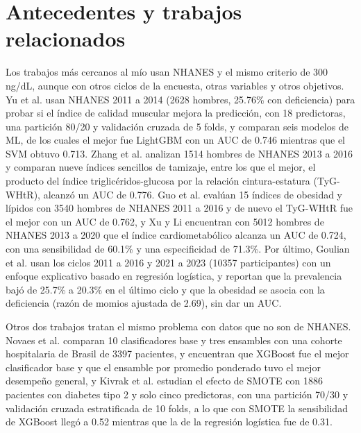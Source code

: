 \documentclass[conference]{IEEEtran}
\begin{document}
\section{Antecedentes y trabajos relacionados}
\label{sec:antecedentes}

Los trabajos más cercanos al mío usan NHANES y el mismo criterio de 300 ng/dL, aunque con otros ciclos de la encuesta, otras variables y otros objetivos. Yu et al. \cite{yu2025} usan NHANES 2011 a 2014 (2628 hombres, 25.76\% con deficiencia) para probar si el índice de calidad muscular mejora la predicción, con 18 predictoras, una partición 80/20 y validación cruzada de 5 folds, y comparan seis modelos de ML, de los cuales el mejor fue LightGBM con un AUC de 0.746 mientras que el SVM obtuvo 0.713. Zhang et al. \cite{zhang2025} analizan 1514 hombres de NHANES 2013 a 2016 y comparan nueve índices sencillos de tamizaje, entre los que el mejor, el producto del índice triglicéridos-glucosa por la relación cintura-estatura (TyG-WHtR), alcanzó un AUC de 0.776. Guo et al. \cite{guo2025} evalúan 15 índices de obesidad y lípidos con 3540 hombres de NHANES 2011 a 2016 y de nuevo el TyG-WHtR fue el mejor con un AUC de 0.762, y Xu y Li \cite{xu2024} encuentran con 5012 hombres de NHANES 2013 a 2020 que el índice cardiometabólico alcanza un AUC de 0.724, con una sensibilidad de 60.1\% y una especificidad de 71.3\%. Por último, Goulian et al. \cite{goulian2026} usan los ciclos 2011 a 2016 y 2021 a 2023 (10357 participantes) con un enfoque explicativo basado en regresión logística, y reportan que la prevalencia bajó de 25.7\% a 20.3\% en el último ciclo y que la obesidad se asocia con la deficiencia (razón de momios ajustada de 2.69), sin dar un AUC.

Otros dos trabajos tratan el mismo problema con datos que no son de NHANES. Novaes et al. \cite{novaes2021} comparan 10 clasificadores base y tres ensambles con una cohorte hospitalaria de Brasil de 3397 pacientes, y encuentran que XGBoost fue el mejor clasificador base y que el ensamble por promedio ponderado tuvo el mejor desempeño general, y Kivrak et al. \cite{kivrak2024} estudian el efecto de SMOTE con 1886 pacientes con diabetes tipo 2 y solo cinco predictoras, con una partición 70/30 y validación cruzada estratificada de 10 folds, a lo que con SMOTE la sensibilidad de XGBoost llegó a 0.52 mientras que la de la regresión logística fue de 0.31.
\end{document}
